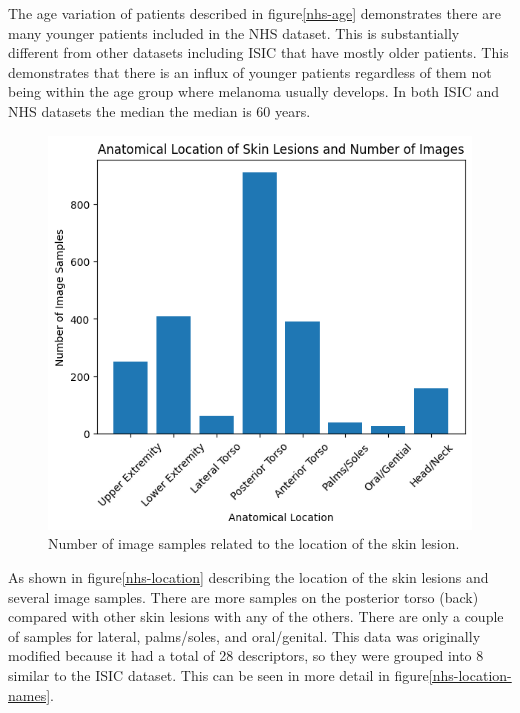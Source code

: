 The age variation of patients described in figure\ref{nhs-age} demonstrates there are many younger patients included in the NHS dataset. This is substantially different from other datasets including ISIC that have mostly older patients. This demonstrates that there is an influx of younger patients regardless of them not being within the age group where melanoma usually develops. In both ISIC and NHS datasets the median the median is 60 years.

\begin{figure}
    \centering
    \includegraphics[scale=0.75]{images/nhs/nhs-location.png}
    \caption{Number of image samples related to the location of the skin lesion.} 
\end{figure}\label{nhs-location}

As shown in figure\ref{nhs-location} describing the location of the skin lesions and several image samples. There are more samples on the posterior torso (back) compared with other skin lesions with any of the others. There are only a couple of samples for lateral, palms/soles, and oral/genital. This data was originally modified because it had a total of 28 descriptors, so they were grouped into 8 similar to the ISIC dataset. This can be seen in more detail in figure\ref{nhs-location-names}.

